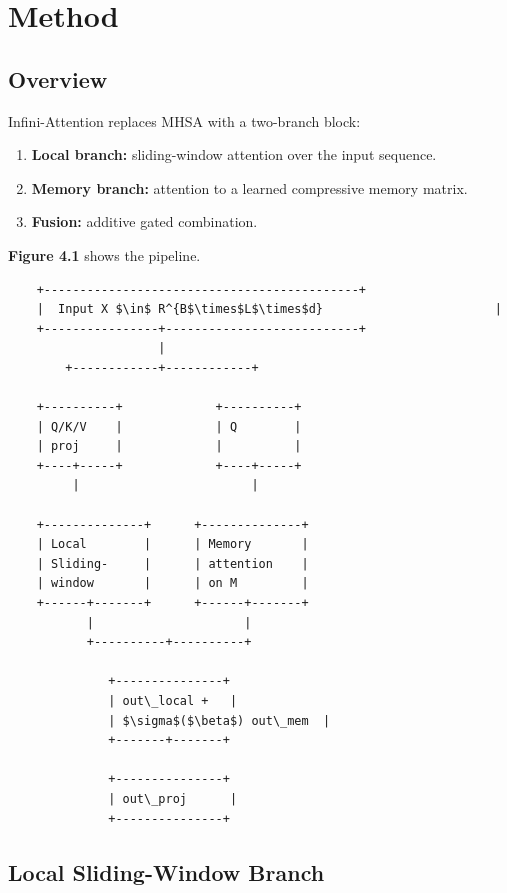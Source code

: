 
\section{Method}

\subsection{Overview}

Infini-Attention replaces MHSA with a two-branch block:

\begin{enumerate}
\item \textbf{Local branch:} sliding-window attention over the input sequence.
\item \textbf{Memory branch:} attention to a learned compressive memory matrix.
\item \textbf{Fusion:} additive gated combination.

\end{enumerate}
\textbf{Figure 4.1} shows the pipeline.

\begin{lstlisting}
    +--------------------------------------------+
    |  Input X $\in$ R^{B$\times$L$\times$d}                        |
    +----------------+---------------------------+
                     |
        +------------+------------+
                                   
    +----------+             +----------+
    | Q/K/V    |             | Q        |
    | proj     |             |          |
    +----+-----+             +----+-----+
         |                        |
                                   
    +--------------+      +--------------+
    | Local        |      | Memory       |
    | Sliding-     |      | attention    |
    | window       |      | on M         |
    +------+-------+      +------+-------+
           |                     |
           +----------+----------+
                       
              +---------------+
              | out\_local +   |
              | $\sigma$($\beta$) out\_mem  |
              +-------+-------+
                       
              +---------------+
              | out\_proj      |
              +---------------+
\end{lstlisting}

\subsection{Local Sliding-Window Branch}

